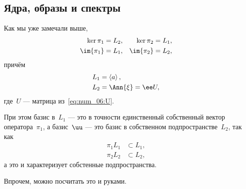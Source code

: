 \begin{solution}
	\subsection{Ядра, образы и спектры}
		Как мы уже замечали выше,
		\begin{align*}
			\ker{\pi_1} &= L_2,
			&
			\ker{\pi_2} &= L_1,
			\\
			\im{\pi_1} &= L_1,
			&
			\im{\pi_2} &= L_2,
		\end{align*}
		причём
		\begin{align*}
			L_1 &= \left< a \right>,
			\\
			L_2 &= \Ann{\xi} = \ee U,
		\end{align*}
		где~$U$ --- матрица из~\eqref{eq:num_06:U}.

		При этом базис в~$L_1$ --- это в точности единственный собственный вектор оператора~$\pi_1$, а базис~$\uu$ --- это базис в собственном подпространстве~$L_2$, так как
		\begin{align*}
			\pi_1 L_1 &\subset L_1,
			\\
			\pi_2 L_2 &\subset L_2,
		\end{align*}
		а это и характеризует собстенные подпространства.

		Впрочем, можно посчитать это и руками.



\end{solution}
